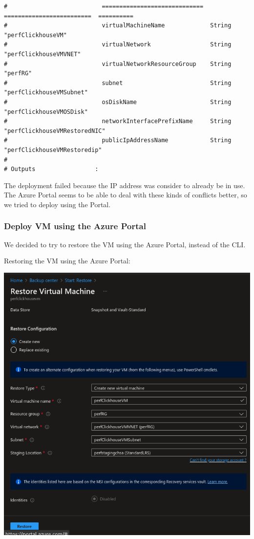 \begin{verbatim}
#                           =============================  =========================  ==========
#                           virtualMachineName             String                     "perfClickhouseVM"
#                           virtualNetwork                 String                     "perfClickhouseVMVNET"
#                           virtualNetworkResourceGroup    String                     "perfRG"
#                           subnet                         String                     "perfClickhouseVMSubnet"
#                           osDiskName                     String                     "perfClickhouseVMOSDisk"
#                           networkInterfacePrefixName     String                     "perfClickhouseVMRestoredNIC"
#                           publicIpAddressName            String                     "perfClickhouseVMRestoredip"
#
# Outputs                 :
\end{verbatim}

The deployment failed because the IP address was consider to already be in use.
The Azure Portal seems to be able to deal with these kinds of conflicts better,
so we tried to deploy using the Portal.

\subsubsection{Deploy VM using the Azure Portal}
\label{sec:org9b58952}
We decided to try to restore the VM using the Azure Portal,
instead of the CLI.

Restoring the VM using the Azure Portal:
\begin{center}
\includegraphics[width=.9\linewidth]{figures/clickhouse/azure_restore_portal.png}
\end{center}

